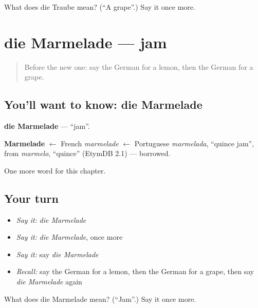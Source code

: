 \begin{tcolorbox}[breakable,colback=teal!4,colframe=teal!35!black,title={Before you move on}]
What does die Traube mean? (\textquotedblleft{}A grape\textquotedblright{}.) Say it once more.
\end{tcolorbox}
\section[die Marmelade]{die Marmelade — jam}

\label{lesson:GE-C73-marmelade}



\begin{quote}
Before the new one: say the German for a lemon, then the German for a grape.
\end{quote}

\subsection*{You'll want to know: die Marmelade}
\textbf{die Marmelade} — \textquotedblleft{}jam\textquotedblright{}.

\begin{cousinweb}
\textbf{Marmelade} $\leftarrow$ French \emph{marmelade} $\leftarrow$ Portuguese \emph{marmelada}, \textquotedblleft{}quince jam\textquotedblright{}, from \emph{marmelo}, \textquotedblleft{}quince\textquotedblright{} (EtymDB 2.1) — borrowed.
\end{cousinweb}

\begin{grammarlens}[title={What you've built}]
One more word for this chapter.
\end{grammarlens}

\subsection*{Your turn}
\begin{itemize}
\raggedright
  \item \emph{Say it:} \emph{die Marmelade}
  \item \emph{Say it:} \emph{die Marmelade}, once more
  \item \emph{Say it:} say \emph{die Marmelade}
  \item \emph{Recall:} say the German for a lemon, then the German for a grape, then say \emph{die Marmelade} again
\end{itemize}

\begin{tcolorbox}[breakable,colback=teal!4,colframe=teal!35!black,title={Before you move on}]
What does die Marmelade mean? (\textquotedblleft{}Jam\textquotedblright{}.) Say it once more.
\end{tcolorbox}
